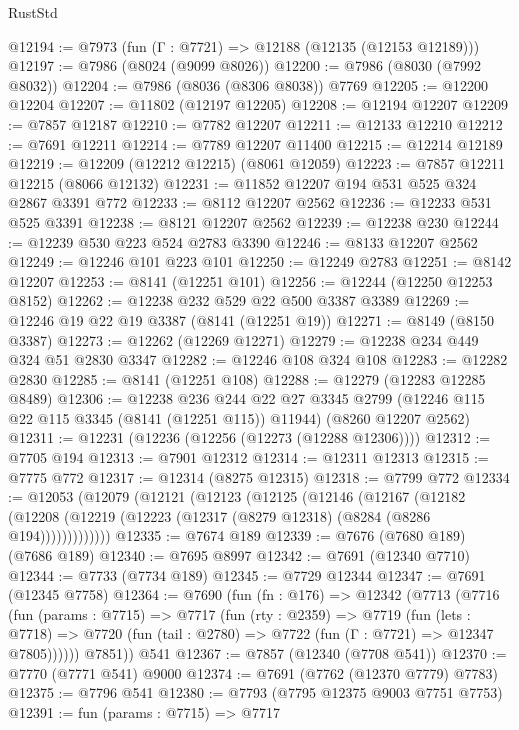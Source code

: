 \begin{lexlean}{RustStd}
\begin{coremodule}
@12194 := @7973 (fun (Γ : @7721) => @12188 (@12135 (@12153 @12189)))
@12197 := @7986 (@8024 (@9099 @8026))
@12200 := @7986 (@8030 (@7992 @8032))
@12204 := @7986 (@8036 (@8306 @8038)) @7769
@12205 := @12200 @12204
@12207 := @11802 (@12197 @12205)
@12208 := @12194 @12207
@12209 := @7857 @12187
@12210 := @7782 @12207
@12211 := @12133 @12210
@12212 := @7691 @12211
@12214 := @7789 @12207 @11400
@12215 := @12214 @12189
@12219 := @12209 (@12212 @12215) (@8061 @12059)
@12223 := @7857 @12211 @12215 (@8066 @12132)
@12231 := @11852 @12207 @194 @531 @525 @324 @2867 @3391 @772
@12233 := @8112 @12207 @2562
@12236 := @12233 @531 @525 @3391
@12238 := @8121 @12207 @2562
@12239 := @12238 @230
@12244 := @12239 @530 @223 @524 @2783 @3390
@12246 := @8133 @12207 @2562
@12249 := @12246 @101 @223 @101
@12250 := @12249 @2783
@12251 := @8142 @12207
@12253 := @8141 (@12251 @101)
@12256 := @12244 (@12250 @12253 @8152)
@12262 := @12238 @232 @529 @22 @500 @3387 @3389
@12269 := @12246 @19 @22 @19 @3387 (@8141 (@12251 @19))
@12271 := @8149 (@8150 @3387)
@12273 := @12262 (@12269 @12271)
@12279 := @12238 @234 @449 @324 @51 @2830 @3347
@12282 := @12246 @108 @324 @108
@12283 := @12282 @2830
@12285 := @8141 (@12251 @108)
@12288 := @12279 (@12283 @12285 @8489)
@12306 := @12238
    @236
    @244
    @22
    @27
    @3345
    @2799
    (@12246 @115 @22 @115 @3345 (@8141 (@12251 @115)) @11944)
    (@8260 @12207 @2562)
@12311 := @12231 (@12236 (@12256 (@12273 (@12288 @12306))))
@12312 := @7705 @194
@12313 := @7901 @12312
@12314 := @12311 @12313
@12315 := @7775 @772
@12317 := @12314 (@8275 @12315)
@12318 := @7799 @772
@12334 := @12053
    (@12079
      (@12121
        (@12123
          (@12125
            (@12146
              (@12167
                (@12182
                  (@12208 (@12219 (@12223 (@12317 (@8279 @12318) (@8284 (@8286 @194)))))))))))))
@12335 := @7674 @189
@12339 := @7676 (@7680 @189) (@7686 @189)
@12340 := @7695 @8997
@12342 := @7691 (@12340 @7710)
@12344 := @7733 (@7734 @189)
@12345 := @7729 @12344
@12347 := @7691 (@12345 @7758)
@12364 := @7690
    (fun (fn : @176) =>
    @12342
      (@7713
        (@7716
          (fun (params : @7715) =>
          @7717
            (fun (rty : @2359) =>
            @7719
              (fun (lets : @7718) =>
              @7720 (fun (tail : @2780) => @7722 (fun (Γ : @7721) => @12347 @7805))))))
        @7851))
    @541
@12367 := @7857 (@12340 (@7708 @541))
@12370 := @7770 (@7771 @541) @9000
@12374 := @7691 (@7762 (@12370 @7779) @7783)
@12375 := @7796 @541
@12380 := @7793 (@7795 @12375 @9003 @7751 @7753)
@12391 := fun (params : @7715) =>
  @7717

\end{coremodule}
\end{lexlean}
